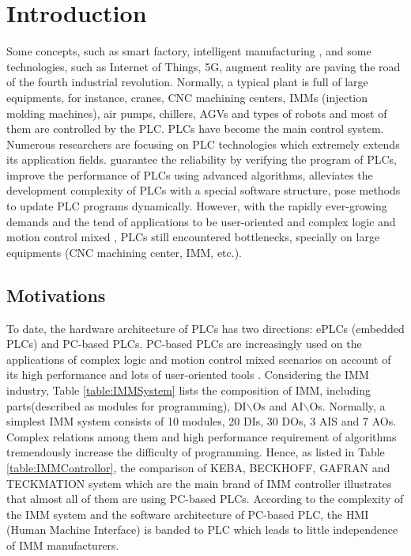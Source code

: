 \documentclass[journal,UTF8]{IEEEtran}
\begin{document}
\section{Introduction}
Some concepts, such as smart factory, intelligent manufacturing \cite{Gonzalez2017Supervisory,Chekired2018Industrial}, and some technologies, such as Internet of Things, 5G, augment reality \cite{Li2018Energy,Ling20185G} are paving the road of the fourth industrial revolution. Normally, a typical plant is full of large equipments, for instance, cranes, CNC machining centers, IMMs (injection molding machines), air pumps, chillers, AGVs and types of robots and most of them are controlled by the PLC. PLCs have become the main control system. Numerous researchers are focusing on PLC technologies which extremely extends its application fields. \cite{Carlsson2012Methods,Obermeier2015A,Adiego2015Applying} guarantee the reliability by verifying the program of PLCs, \cite{Gerk2006Advanced,Chang2007Adaptive,Dominic2016PLC} improve the performance of PLCs using advanced algorithms, \cite{WuA} alleviates the development complexity of PLCs with a special software structure, \cite{Sch2013Development,Morenas2017Shop} pose methods to update PLC programs dynamically.
However, with the rapidly ever-growing demands and the tend of applications to be user-oriented and complex logic and motion control mixed \cite{Zaeh2005A,Hossain2014Advanced}, PLCs still encountered bottlenecks, specially on large equipments (CNC machining center, IMM, etc.).

\subsection{Motivations}
To date, the hardware architecture of PLCs has two directions: ePLCs (embedded PLCs) and PC-based PLCs. PC-based PLCs are increasingly used on the applications of complex logic and motion control mixed scenarios on account of its high performance and lots of user-oriented tools \cite{Hossain2014Advanced}. Considering the IMM industry, Table \ref{table:IMMSystem} lists the composition of IMM, including parts(described as modules for programming), DI$\backslash$Os and AI$\backslash$Os. Normally, a simplest IMM system consists of 10 modules, 20 DIs, 30 DOs, 3 AIS and 7 AOs. Complex relations among them and high performance requirement of algorithms tremendously increase the difficulty of programming. Hence, as listed in Table \ref{table:IMMControllor}, the comparison of KEBA, BECKHOFF, GAFRAN and TECKMATION system which are the main brand of IMM controller illustrates that almost all of them are using PC-based PLCs. According to the complexity of the IMM system and the software architecture of PC-based PLC, the HMI (Human Machine Interface) is banded to PLC which leads to little independence of IMM manufacturers. 
\end{document}
